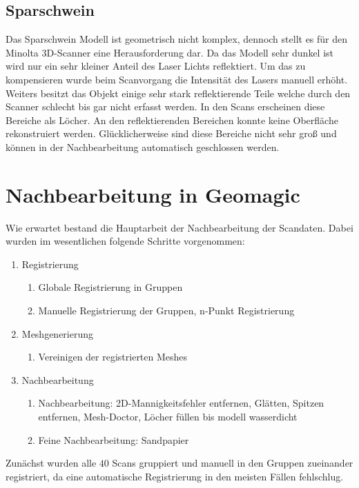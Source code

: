 \documentclass[]{article}
\begin{document}
\subsection{Sparschwein}
Das Sparschwein Modell ist geometrisch nicht komplex, dennoch stellt es für den Minolta 3D-Scanner eine Herausforderung dar. Da das Modell sehr dunkel ist wird  nur ein sehr kleiner Anteil des Laser Lichts reflektiert. Um das zu kompensieren wurde beim Scanvorgang die Intensität des Lasers manuell erhöht. Weiters besitzt das Objekt einige sehr stark reflektierende Teile welche durch den Scanner schlecht bis gar nicht erfasst werden. In den Scans erscheinen diese Bereiche als Löcher. An den reflektierenden Bereichen konnte keine Oberfläche rekonstruiert werden. Glücklicherweise sind diese Bereiche nicht sehr groß und können in der Nachbearbeitung automatisch geschlossen werden.

\section{Nachbearbeitung in Geomagic} %

Wie erwartet bestand die Hauptarbeit der Nachbearbeitung der Scandaten. Dabei wurden im wesentlichen folgende Schritte vorgenommen:

\begin{enumerate}
\item Registrierung
\begin{enumerate}
\item Globale Registrierung in Gruppen
\item Manuelle Registrierung der Gruppen, n-Punkt Registrierung
\end{enumerate}
\item Meshgenerierung
\begin{enumerate}
\item Vereinigen der registrierten Meshes
\end{enumerate}
\item Nachbearbeitung
\begin{enumerate}
\item Nachbearbeitung: 2D-Mannigkeitsfehler entfernen, Glätten, Spitzen entfernen, Mesh-Doctor, Löcher füllen
bis modell wasserdicht
\item Feine Nachbearbeitung: Sandpapier
\end{enumerate}
\end{enumerate}


Zunächst wurden alle $40$ Scans gruppiert und manuell in den Gruppen zueinander registriert, da eine automatische Registrierung in den meisten Fällen fehlschlug.
\end{document}
